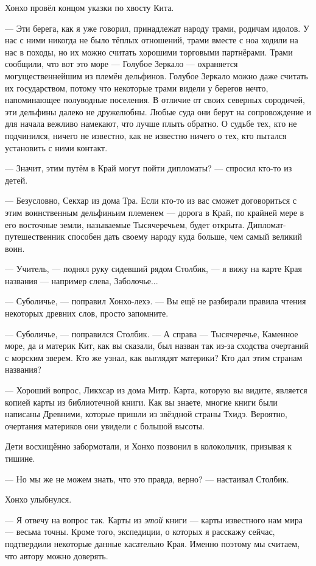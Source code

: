 Хонхо провёл концом указки по хвосту Кита.

--- Эти берега, как я уже говорил, принадлежат народу трами, родичам идолов.
У нас с ними никогда не было тёплых отношений, трами вместе с ноа ходили на нас в походы, но их можно считать хорошими торговыми партнёрами.
Трами сообщили, что вот это море --- Голубое Зеркало --- охраняется могущественнейшим из племён дельфинов.
Голубое Зеркало можно даже считать их государством, потому что некоторые трами видели у берегов нечто, напоминающее полуводные поселения.
В отличие от своих северных сородичей, эти дельфины далеко не дружелюбны.
Любые суда они берут на сопровождение и для начала вежливо намекают, что лучше плыть обратно.
О судьбе тех, кто не подчинился, ничего не известно, как не известно ничего о тех, кто пытался установить с ними контакт.

--- Значит, этим путём в Край могут пойти дипломаты? --- спросил кто-то из детей.

--- Безусловно, Секхар из дома Тра.
Если кто-то из вас сможет договориться с этим воинственным дельфиньим племенем --- дорога в Край, по крайней мере в его восточные земли, называемые Тысячеречьем, будет открыта.
Дипломат-путешественник способен дать своему народу куда больше, чем самый великий воин.

--- Учитель, --- поднял руку сидевший рядом Столбик, --- я вижу на карте Края названия --- например слева, Заболочье...

--- Суболичье, --- поправил Хонхо-лехэ.
--- Вы ещё не разбирали правила чтения некоторых древних слов, просто запомните.

--- Суболичье, --- поправился Столбик.
--- А справа --- Тысячеречье, Каменное море, да и материк Кит, как вы сказали, был назван так из-за сходства очертаний с морским зверем.
Кто же узнал, как выглядят материки?
Кто дал этим странам названия?

--- Хороший вопрос, Ликхсар из дома Митр.
Карта, которую вы видите, является копией карты из библиотечной книги.
Как вы знаете, многие книги были написаны Древними, которые пришли из звёздной страны Тхидэ.
Вероятно, очертания материков они увидели с большой высоты.

Дети восхищённо забормотали, и Хонхо позвонил в колокольчик, призывая к тишине.

--- Но мы же не можем знать, что это правда, верно? --- настаивал Столбик.

Хонхо улыбнулся.

--- Я отвечу на вопрос так.
Карты из \emph{этой} книги --- карты известного нам мира --- весьма точны.
Кроме того, экспедиции, о которых я расскажу сейчас, подтвердили некоторые данные касательно Края.
Именно поэтому мы считаем, что автору можно доверять.

